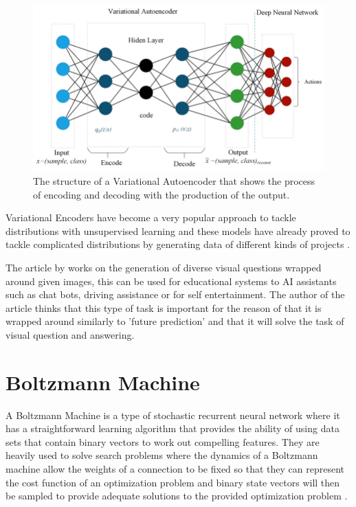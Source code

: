 \begin{figure}[t!]
  \centering
  \includegraphics[width=1\linewidth]{graphics/generational_models/vae.png}
  \caption[Caption for VAE]{The structure of a Variational Autoencoder that shows the process of encoding and decoding with the production of the output.}
  \label{fig:VAE}
\end{figure}

Variational Encoders have become a very popular approach to tackle distributions with unsupervised learning and these models have already proved to tackle complicated distributions by generating data of different kinds of projects \citep{doersch:2016}.

The article by \citet{jain:2017} works on the generation of diverse visual questions wrapped around given images, this can be used for educational systems to AI assistants such as chat bots, driving assistance or for self entertainment. The author of the article thinks that this type of task is important for the reason of that it is wrapped around similarly to 'future prediction' and that it will solve the task of visual question and answering.   

\section{Boltzmann Machine}

A Boltzmann Machine  is a type of stochastic recurrent neural network where it has a straightforward learning algorithm that provides the ability of using data sets that contain binary vectors to work out compelling features. They are heavily used to solve search problems where the dynamics of a Boltzmann machine allow the weights of a connection to be fixed so that they can represent the cost function of an optimization problem and binary state vectors will then be sampled to provide adequate solutions to the provided optimization problem \citep{hinton:2007}. 

